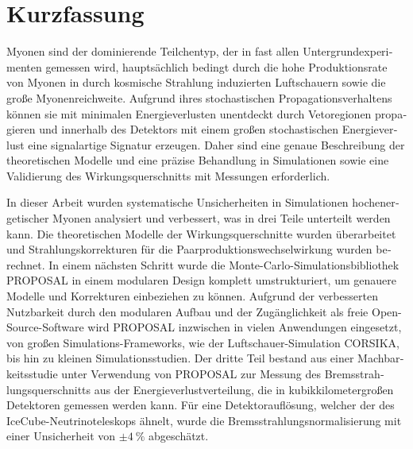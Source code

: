 \section*{Kurzfassung}
\begin{german}
Myonen sind der dominierende Teilchentyp, der in fast allen Untergrundexperimenten gemessen wird, hauptsächlich bedingt durch die hohe Produktionsrate von Myonen in durch kosmische Strahlung induzierten Luftschauern sowie die große Myonenreichweite.
Aufgrund ihres stochastischen Propagationsverhaltens können sie mit minimalen Energieverlusten unentdeckt durch Vetoregionen propagieren und innerhalb des Detektors mit einem großen stochastischen Energieverlust eine signalartige Signatur erzeugen.
Daher sind eine genaue Beschreibung der theoretischen Modelle und eine präzise Behandlung in Simulationen sowie eine Validierung des Wirkungsquerschnitts mit Messungen erforderlich.

In dieser Arbeit wurden systematische Unsicherheiten in Simulationen hochenergetischer Myonen analysiert und verbessert, was in drei Teile unterteilt werden kann.
Die theoretischen Modelle der Wirkungsquerschnitte wurden überarbeitet und Strahlungskorrekturen für die Paarproduktionswechselwirkung wurden berechnet.
In einem nächsten Schritt wurde die Monte-Carlo-Simulationsbibliothek PROPOSAL in einem modularen Design komplett umstrukturiert, um genauere Modelle und Korrekturen einbeziehen zu können.
Aufgrund der verbesserten Nutzbarkeit durch den modularen Aufbau und der Zugänglichkeit als freie Open-Source-Software wird PROPOSAL inzwischen in vielen Anwendungen eingesetzt, von großen Simulations-Frameworks, wie der Luftschauer-Simulation CORSIKA, bis hin zu kleinen Simulationsstudien.
Der dritte Teil bestand aus einer Machbarkeitsstudie unter Verwendung von PROPOSAL zur Messung des Bremsstrahlungsquerschnitts aus der Energieverlustverteilung, die in kubikkilometergroßen Detektoren gemessen werden kann.
Für eine Detektorauflösung, welcher der des IceCube-Neutrinoteleskops ähnelt, wurde die Bremsstrahlungsnormalisierung mit einer Unsicherheit von $\pm \SI{4}{\%}$ abgeschätzt.

\end{german}
